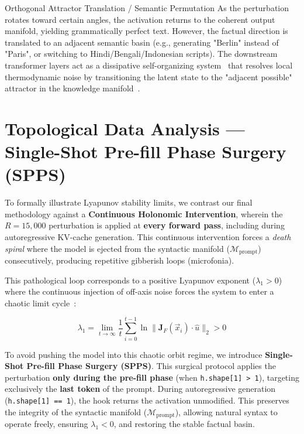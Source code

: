 \documentclass[11pt,a4paper,oneside]{memoir}
\begin{document}
\begin{subsection}{Orthogonal Attractor Translation / Semantic Permutation}
As the perturbation rotates toward certain angles, the activation returns to the coherent output manifold, yielding grammatically perfect text. However, the factual direction is translated to an adjacent semantic basin (e.g., generating "Berlin" instead of "Paris", or switching to Hindi/Bengali/Indonesian scripts). The downstream transformer layers act as a dissipative self-organizing system~\cite{prigogine1977self} that resolves local thermodynamic noise by transitioning the latent state to the "adjacent possible" attractor in the knowledge manifold~\cite{kauffman1993origins}.
\end{subsection}

\chapter{Topological Data Analysis --- Single-Shot Pre-fill Phase Surgery (SPPS)}
\label{sec:tda_gemma3}

To formally illustrate Lyapunov stability limits, we contrast our final methodology against a \textbf{Continuous Holonomic Intervention}, wherein the $R = 15,000$ perturbation is applied at \textbf{every forward pass}, including during autoregressive KV-cache generation. This continuous intervention forces a \textit{death spiral} where the model is ejected from the syntactic manifold ($\mathcal{M}_{\text{prompt}}$) consecutively, producing repetitive gibberish loops (microfonia). 

This pathological loop corresponds to a positive Lyapunov exponent ($\lambda_1 > 0$) where the continuous injection of off-axis noise forces the system to enter a chaotic limit cycle~\cite{kiwitt2026lyapunov}:

\begin{equation}
\lambda_1 = \lim_{t \to \infty} \frac{1}{t} \sum_{i=0}^{t-1} \ln \| \mathbf{J}_F(\vec{x}_i) \cdot \hat{u} \|_2 > 0
\label{eq:lyapunov_spectra}
\end{equation}

To avoid pushing the model into this chaotic orbit regime, we introduce \textbf{Single-Shot Pre-fill Phase Surgery (SPPS)}. This surgical protocol applies the perturbation \textbf{only during the pre-fill phase} (when \texttt{h.shape[1] > 1}), targeting exclusively the \textbf{last token} of the prompt. During autoregressive generation (\texttt{h.shape[1] == 1}), the hook returns the activation unmodified. This preserves the integrity of the syntactic manifold ($\mathcal{M}_{\text{prompt}}$), allowing natural syntax to operate freely, ensuring $\lambda_1 < 0$, and restoring the stable factual basin.
\end{document}
